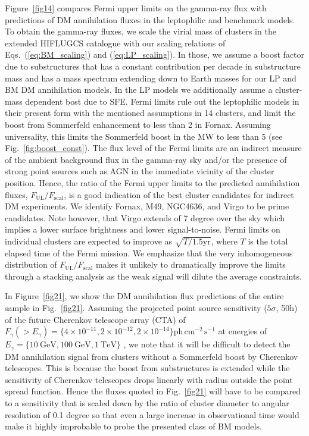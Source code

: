 \documentclass[10pt,aps,pra,reprint,amsmath,amsfonts,amssymb,showpacs,nofootinbib,floatfix]{revtex4-1}
\newcommand{\rmn}{\mathrm}
\begin{document}
Figure~\ref{fig14} compares Fermi upper limits on the gamma-ray flux
with predictions of DM annihilation fluxes in the leptophilic and
benchmark models.  To obtain the gamma-ray fluxes, we scale the virial
mass of clusters in the extended HIFLUGCS catalogue
\cite{2002ApJ...567..716R} with our scaling relations of
Eqs.~(\ref{eq:BM_scaling}) and (\ref{eq:LP_scaling}). In those, we
assume a boost factor due to substructures that has a constant
contribution per decade in substructure mass and has a mass spectrum
extending down to Earth masses for our LP and BM DM annihilation
models. In the LP models we additionally assume a cluster-mass
dependent bost due to SFE. Fermi limits rule out the leptophilic
models in their present form with the mentioned assumptions in 14
clusters, and limit the boost from Sommerfeld enhancement to less than
2 in Fornax. Assuming universality, this limits the Sommerfeld boost
in the MW to less than 5 (see Fig.~\ref{fig:boost_const}).  The flux
level of the Fermi limits are an indirect measure of the ambient
background flux in the gamma-ray sky and/or the presence of strong
point sources such as AGN in the immediate vicinity of the cluster
position. Hence, the ratio of the Fermi upper limits to the predicted
annihilation fluxes, $F_{\mathrm{UL}}/F_{\mathrm{scal}}$, is a good
indication of the best cluster candidates for indirect DM
experiments. We identify Fornax, M49, NGC4636, and Virgo to be prime
candidates. Note however, that Virgo extends of 7 degree over the sky
which implies a lower surface brightness and lower signal-to-noise.
Fermi limits on individual clusters are expected to improve as
$\sqrt{T/1.5 \mathrm{yr}}$, where $T$ is the total elapsed time of the
Fermi mission. We emphasize that the very inhomogeneous distribution
of $F_{\mathrm{UL}}/ F_{\mathrm{scal}}$ makes it unlikely to
dramatically improve the limits through a stacking analysis as the
weak signal will dilute the average constraints.

In Figure~\ref{fig21}, we show the DM annihilation flux predictions of
the entire sample in Fig.~\ref{fig21}.  Assuming the projected point
source sensitivity ($5\sigma$, 50h) of the future Cherenkov telescope
array (CTA) of $F_\gamma(>E_\gamma) = \{4\times10^{-11},
2\times10^{-12}, 2\times10^{-14}\}
\rmn{ph}\,\rmn{cm}^{-2}\,\rmn{s}^{-1}$ at energies of
$E_\gamma=\{10~\rmn{GeV}, 100~\rmn{GeV}, 1~\rmn{TeV}\}$
\cite{2009arXiv0908.1410D}, we note that it will be difficult to
detect the DM annihilation signal from clusters without a Sommerfeld
boost by Cherenkov telescopes.  This is because the boost from
substructures is extended while the sensitivity of Cherenkov
telescopes drops linearly with radius outside the point spread
function. Hence the fluxes quoted in Fig.~\ref{fig21} will have to be
compared to a sensitivity that is scaled down by the ratio of cluster
diameter to angular resolution of 0.1 degree so that even a large
increase in observational time would make it highly improbable to
probe the presented class of BM models.
\end{document}
